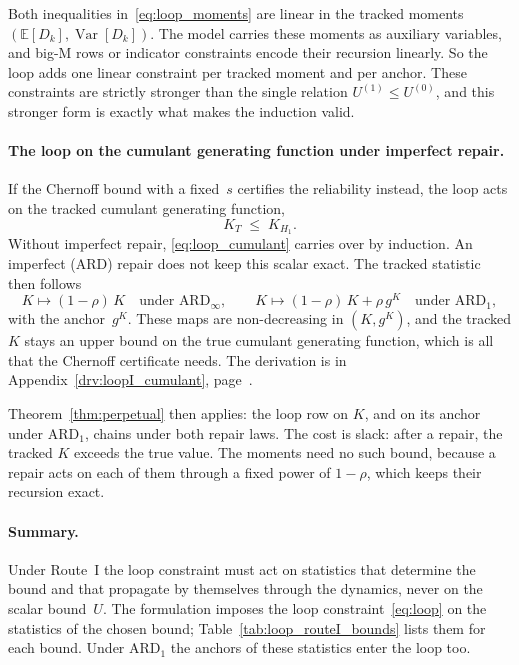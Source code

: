 \documentclass[11pt,a4paper]{article}
\theoremstyle{plain}
\theoremstyle{definition}
\theoremstyle{remark}
\begin{document}
Both inequalities in~\eqref{eq:loop_moments} are linear in the tracked moments $(\mathbb{E}[D_k],\operatorname{Var}[D_k])$.
The model carries these moments as auxiliary variables, and big-M rows or indicator constraints encode their recursion linearly.
So the loop adds one linear constraint per tracked moment and per anchor.
These constraints are strictly stronger than the single relation $U^{(1)} \le U^{(0)}$, and this stronger form is exactly what makes the induction valid.

\paragraph{The loop on the cumulant generating function under imperfect repair.}
If the Chernoff bound with a fixed~$s$ certifies the reliability instead, the loop acts on the tracked cumulant generating function,
\begin{equation}\label{eq:loop_cumulant}
  K_T \;\le\; K_{H_1}.
\end{equation}
Without imperfect repair, \eqref{eq:loop_cumulant} carries over by induction.
An imperfect (ARD) repair does not keep this scalar exact.
The tracked statistic then follows
\begin{equation}\label{eq:loopI_cgf_maps}
  K \mapsto (1-\rho)\,K \quad \text{under $\text{ARD}_\infty$},
  \qquad
  K \mapsto (1-\rho)\,K + \rho\,g^K \quad \text{under $\text{ARD}_1$},
\end{equation}
with the anchor~$g^K$.
These maps are non-decreasing in $(K, g^K)$, and the tracked $K$ stays an upper bound on the true cumulant generating function, which is all that the Chernoff certificate needs.
The derivation is in Appendix~\ref{drv:loopI_cumulant}, page~\pageref{drv:loopI_cumulant}.

Theorem~\ref{thm:perpetual} then applies: the loop row on $K$, and on its anchor under $\text{ARD}_1$, chains under both repair laws.
The cost is slack: after a repair, the tracked $K$ exceeds the true value.
The moments need no such bound, because a repair acts on each of them through a fixed power of $1-\rho$, which keeps their recursion exact.

\paragraph{Summary.}
Under Route~I the loop constraint must act on statistics that determine the bound and that propagate by themselves through the dynamics, never on the scalar bound~$U$.
The formulation imposes the loop constraint~\eqref{eq:loop} on the statistics of the chosen bound; Table~\ref{tab:loop_routeI_bounds} lists them for each bound.
Under $\text{ARD}_1$ the anchors of these statistics enter the loop too.
\end{document}
